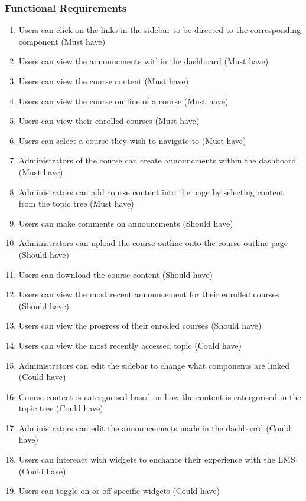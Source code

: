 \subsubsection{Functional Requirements}
\begin{enumerate}
    \item Users can click on the links in the sidebar to be directed to the corresponding component (Must have)
    \item Users can view the announcments within the dashboard (Must have)
    \item Users can view the course content (Must have)
    \item Users can view the course outline of a course (Must have)
    \item Users can view their enrolled courses (Must have)
    \item Users can select a course they wish to navigate to (Must have)
    \item Administrators of the course can create announcments within the dashboard (Must have) 
    \item Administrators can add course content into the page by selecting content from the topic tree (Must have)
    \item Users can make comments on announcments (Should have)
    \item Administrators can upload the course outline onto the course outline page (Should have)
    \item Users can download the course content (Should have)
    \item Users can view the most recent announcement for their enrolled courses (Should have)
    \item Users can view the progress of their enrolled courses (Should have)
    \item Users can view the most recently accessed topic (Could have)
    \item Administrators can edit the sidebar to change what components are linked (Could have)
    \item Course content is catergorised based on how the content is catergorised in the topic tree (Could have)
    \item Administrators can edit the announcements made in the dashboard (Could have)
    \item Users can intereact with widgets to enchance their experience with the LMS (Could have)
    \item Users can toggle on or off specific widgets (Could have)
\end{enumerate}

